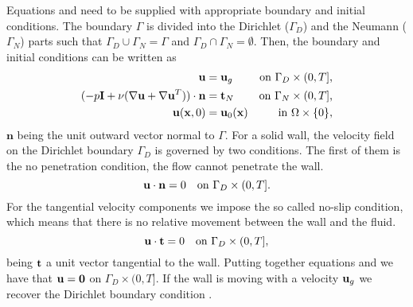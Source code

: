 Equations  and  need to be supplied with appropriate boundary and initial conditions. The boundary $\Gamma$ is divided into the Dirichlet ($\Gamma_D$) and the Neumann ($\Gamma_N$) parts such that $\Gamma_D\cup\Gamma_N=\Gamma$ and $\Gamma_D\cap\Gamma_N=\emptyset$. Then, the boundary and initial conditions can be written as
\begin{align}
\label{eq-NS_strong_Dir}
{\bf u}&={\bf u}_g&\mbox{on $\Gamma_D\times(0,T]$,}\\
\label{eq-NS_strong_Neu}
(-p\mathbf{I}+\nu(\nabla{\bf u}+\nabla{\bf u}^T))\cdot\mathbf{n}&=\mathbf{t}_N&\mbox{on $\Gamma_N\times(0,T]$,}\\
\label{eq-NS_strong_Ini}
{\bf u}({\bf x},0)&={\bf u}_0({\bf x})&\mbox{in $\Omega\times\{0\}$,}
\end{align}
$\mathbf{n}$ being the unit outward vector normal to $\Gamma$. For a solid wall, the velocity field on the Dirichlet boundary $\Gamma_D$ is governed by two conditions. The first of them is the no penetration condition, the flow cannot penetrate the wall.
\begin{equation}
\label{eq-NS_no_penetration}
{\bf u}\cdot{\bf n}=0\quad\mbox{on $\Gamma_D\times(0,T]$}.
\end{equation} 
For the tangential velocity components we impose the so called no-slip condition, which means that there is no relative movement between the wall and the fluid.
\begin{equation}
\label{eq-NS_no_slip}
{\bf u}\cdot{\bf t}=0\quad\mbox{on $\Gamma_D\times(0,T]$},
\end{equation}
being ${\bf t}$ a unit vector tangential to the wall. Putting together equations  and  we have that ${\bf u}=\mathbf{0}$ on $\Gamma_D\times(0,T]$. If the wall is moving with a velocity ${\bf u}_g$ we recover the Dirichlet boundary condition .

